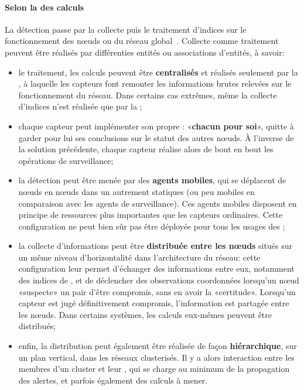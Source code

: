         \paragraph{Selon la  des calculs}
La détection passe par la collecte puis le traitement d'indices sur le fonctionnement des nœuds ou du réseau global~\cite{BMS13}.
Collecte comme traitement peuvent être réalisés par différenties entités ou associations d'entités, à savoir:
\begin{itemize}
    \item le traitement, les calculs peuvent être \textbf{centralisés} et réalisés seulement par la \sdb, à laquelle les capteurs font remonter les informations brutes relevées sur le fonctionnement du réseau. Dans certains cas extrêmes, même la collecte d'indices n'est réalisée que par la \sdb;
    \item chaque capteur peut implémenter son propre \ids: «\textbf{chacun pour soi}», quitte à garder pour lui ses conclusions sur le statut des autres nœuds. À l'inverse de la solution précédente, chaque capteur réalise alors de bout en bout les opérations de surveillance;
    \item la détection peut être menée par des \textbf{agents mobiles}, qui se déplacent de nœuds en nœuds dans un \rc autrement statiques (ou peu mobiles en comparaison avec les agents de surveillance). Ces agents mobiles disposent en principe de ressources plus importantes que les capteurs ordinaires. Cette configuration ne peut bien sûr pas être déployée pour tous les usages des \rcs;
    \item la collecte d'informations peut être \textbf{distribuée entre les nœuds} situés sur un même niveau d'horizontalité dans l'architecture du réseau: cette configuration leur permet d'échanger des informations entre eux, notamment des indices de , et de déclencher des observations coordonnées lorsqu'un nœud «suspecte» un pair d'être compromis, sans en avoir la «certitude». Lorsqu'un capteur est jugé définitivement compromis, l'information est partagée entre les nœuds. Dans certains systèmes, les calculs eux-mêmes peuvent être distribués;
    \item enfin, la distribution peut également être réalisée de façon \textbf{hiérarchique}, sur un plan vertical, dans les réseaux clusterisés. Il y a alors interaction entre les membres d'un cluster et leur \ch, qui se charge au minimum de la propagation des alertes, et parfois également des calculs à mener.
\end{itemize}

